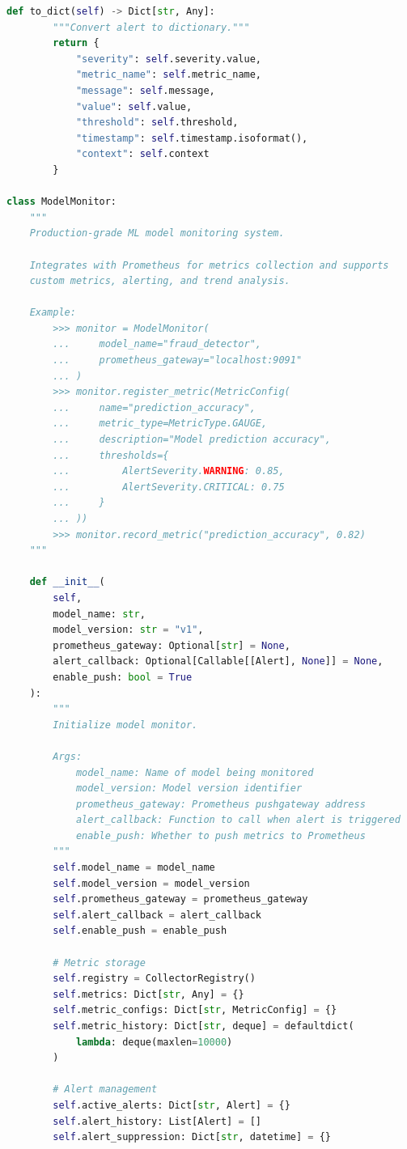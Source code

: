 \begin{lstlisting}[language=Python, caption={Comprehensive Model Performance Monitor}]
    def to_dict(self) -> Dict[str, Any]:
        """Convert alert to dictionary."""
        return {
            "severity": self.severity.value,
            "metric_name": self.metric_name,
            "message": self.message,
            "value": self.value,
            "threshold": self.threshold,
            "timestamp": self.timestamp.isoformat(),
            "context": self.context
        }

class ModelMonitor:
    """
    Production-grade ML model monitoring system.

    Integrates with Prometheus for metrics collection and supports
    custom metrics, alerting, and trend analysis.

    Example:
        >>> monitor = ModelMonitor(
        ...     model_name="fraud_detector",
        ...     prometheus_gateway="localhost:9091"
        ... )
        >>> monitor.register_metric(MetricConfig(
        ...     name="prediction_accuracy",
        ...     metric_type=MetricType.GAUGE,
        ...     description="Model prediction accuracy",
        ...     thresholds={
        ...         AlertSeverity.WARNING: 0.85,
        ...         AlertSeverity.CRITICAL: 0.75
        ...     }
        ... ))
        >>> monitor.record_metric("prediction_accuracy", 0.82)
    """

    def __init__(
        self,
        model_name: str,
        model_version: str = "v1",
        prometheus_gateway: Optional[str] = None,
        alert_callback: Optional[Callable[[Alert], None]] = None,
        enable_push: bool = True
    ):
        """
        Initialize model monitor.

        Args:
            model_name: Name of model being monitored
            model_version: Model version identifier
            prometheus_gateway: Prometheus pushgateway address
            alert_callback: Function to call when alert is triggered
            enable_push: Whether to push metrics to Prometheus
        """
        self.model_name = model_name
        self.model_version = model_version
        self.prometheus_gateway = prometheus_gateway
        self.alert_callback = alert_callback
        self.enable_push = enable_push

        # Metric storage
        self.registry = CollectorRegistry()
        self.metrics: Dict[str, Any] = {}
        self.metric_configs: Dict[str, MetricConfig] = {}
        self.metric_history: Dict[str, deque] = defaultdict(
            lambda: deque(maxlen=10000)
        )

        # Alert management
        self.active_alerts: Dict[str, Alert] = {}
        self.alert_history: List[Alert] = []
        self.alert_suppression: Dict[str, datetime] = {}


\end{lstlisting}
